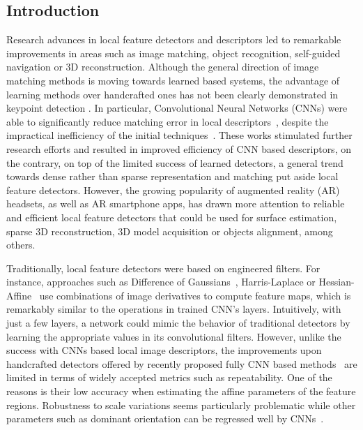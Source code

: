 \subsection{Introduction}
Research advances in local feature detectors and descriptors led to remarkable improvements in areas such as image matching, object recognition, self-guided navigation or 3D reconstruction. Although the general direction of image matching methods is moving towards learned based systems, the advantage of learning methods over handcrafted ones has not been clearly demonstrated in keypoint detection \cite{Karel_Vedaldi_BMVC_18}. In particular, Convolutional Neural Networks (CNNs) were able to significantly reduce matching error in local descriptors~\cite{HPatches}, despite the impractical inefficiency of the initial techniques~\cite{MatchNet15,Zagoruyko15}. 
These works stimulated further research efforts and resulted in improved efficiency of CNN based descriptors, on the contrary, on top of the limited success of learned detectors, a general trend towards dense rather than sparse representation and matching put aside local feature detectors. 
However, the growing popularity of augmented reality (AR) headsets, as well as AR smartphone apps, has drawn more attention to reliable and efficient local feature detectors that could be used for surface estimation, sparse 3D reconstruction, 3D model acquisition or objects alignment, among others. \par

Traditionally, local feature detectors were based on engineered filters. For instance, approaches such as Difference of Gaussians~\cite{SIFT}, Harris-Laplace or Hessian-Affine~\cite{mikolajczykIJCV2004} use combinations of image derivatives to compute feature maps, which is remarkably similar to the operations in trained CNN's layers. Intuitively, with just a few layers, a network could mimic the behavior of traditional detectors by learning the appropriate values in its convolutional filters. However, unlike the success with CNNs based local image descriptors, the improvements upon handcrafted detectors offered by recently proposed fully CNN based methods~\cite{LIFT,DeTone_MagicPoint17,Karel_Vedaldi_ECCV_16, Zhang_Felix_CVPR_17,OnoSerra18} are limited in terms of widely accepted metrics such as repeatability. One of the reasons is their low accuracy when estimating the affine parameters of the feature regions. Robustness to scale variations seems particularly problematic while other parameters such as dominant orientation can be regressed well by CNNs~\cite{Yi_Verdie_Fua_Lepetit_CVPR16, LIFT}.

